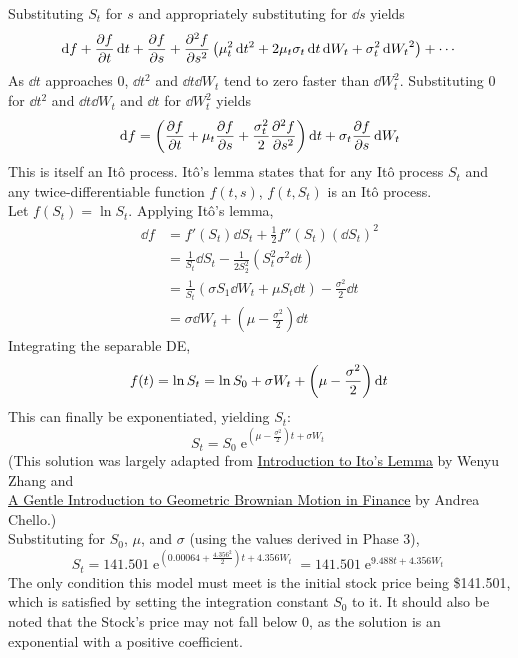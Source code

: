 \documentclass[12pt, A4]{article}
\DeclareMathOperator{\en}{e}
\begin{document}
			Substituting \(S_t\) for \(s\) and appropriately substituting for \(\dd{s}\) yields
			\[\dd{f} + \pdv{f}{t}\dd{t} + \pdv{f}{s} (\mu_t\dd{t} + \sigma_t\dd{W_t}) + \pdv[2]{f}{s}\left(\mu_t^2\dd{t^2} + 2\mu_t\sigma_t\dd{t}\dd{W_t} + \sigma_t^2\dd{W_t}^2\right) + \cdots\]
			As \(\dd{t}\) approaches 0, \(\dd{t}^2\) and \(\dd{t}\dd{W_t}\) tend to zero faster than \(\dd{W_t^2}\). Substituting 0 for \(\dd{t^2}\) and \(\dd{t}\dd{W_t}\) and \(\dd{t}\) for \(\dd{W_t^2}\) yields
			\[\dd{f} = \left(\pdv{f}{t} + \mu_t\pdv{f}{s} + \frac{\sigma_t^2}{2}\pdv[2]{f}{s}\right)\dd{t} + \sigma_t\pdv{f}{s}\dd{W_t}\]
			This is itself an It\^o process. It\^o's lemma states that for any It\^o process \(S_t\) and any twice-differentiable function \(f(t, s)\), \(f(t, S_t)\) is an It\^o process. \\
		Let \(f(S_t) = \ln S_t\). Applying It\^o's lemma,
			\begin{align*}
				\dd{f} &= f'(S_t)\dd{S_t} + \frac{1}{2}f''(S_t)(\dd{S_t})^2 \\
					&= \frac{1}{S_t}\dd{S_t} - \frac{1}{2S_2^2}\left(S_t^2\sigma^2\dd{t}\right) \\
					&= \frac{1}{S_t}(\sigma S_1 \dd{W_t} + \mu S_t \dd{t}) - \frac{\sigma^2}{2}\dd{t} \\
					&= \sigma \dd{W_t} + \left(\mu - \frac{\sigma^2}{2}\right)\dd{t}
			\end{align*}
			Integrating the separable DE,
			\[
				f(t) = \ln S_t 
					= \ln S_0 + \sigma W_t + \left(\mu - \frac{\sigma^2}{2}\right)\dd{t} \\
			\]
			This can finally be exponentiated, yielding \(S_t\):
			\[S_t = S_0\en^{\left(\mu - \frac{\sigma^2}{2}\right)t + \sigma W_t}\]
			(This solution was largely adapted from \href{https://pi.math.cornell.edu/~web6720/Wendy_slides.pdf}{\underline{Introduction to Ito's Lemma}} by Wenyu Zhang and \\\href{https://medium.com/the-quant-journey/a-gentle-introduction-to-geometric-brownian-motion-in-finance-68c37ba6f828}{\underline{A Gentle Introduction to Geometric Brownian Motion in Finance}} by Andrea Chello.) \\
			Substituting for \(S_0\), \(\mu\), and \(\sigma\) (using the values derived in Phase 3),
			\[S_t = 141.501\en^{\left(0.00064 + \frac{4.356^2}{2}\right)t + 4.356W_t} = 141.501\en^{9.488t + 4.356W_t}\]
			The only condition this model must meet is the initial stock price being \$141.501, which is satisfied by setting the integration constant \(S_0\) to it. It should also be noted that the Stock's price may not fall below 0, as the solution is an exponential with a positive coefficient. \\
\end{document}
